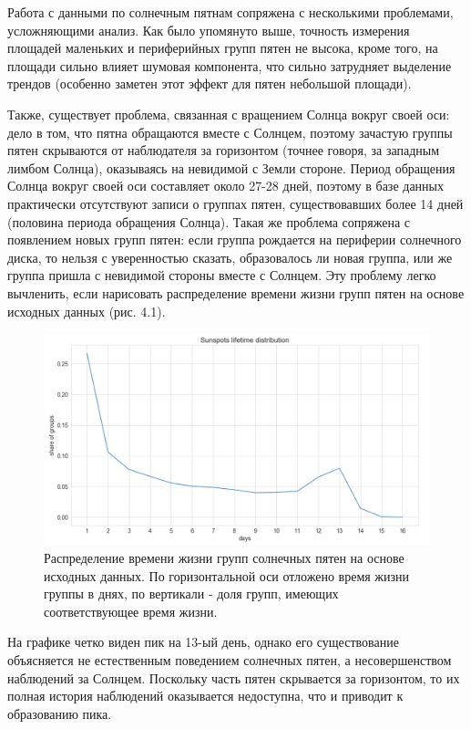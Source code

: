 \documentclass[a4paper, 12pt]{article}
\begin{document}
Работа с данными по солнечным пятнам сопряжена с несколькими проблемами, усложняющими анализ. Как было упомянуто выше, точность измерения площадей маленьких и периферийных групп пятен не высока, кроме того, на площади сильно влияет шумовая компонента, что сильно затрудняет выделение трендов (особенно заметен этот эффект для пятен небольшой площади).

Также, существует проблема, связанная с вращением Солнца вокруг своей оси: дело в том, что пятна обращаются вместе с Солнцем, поэтому зачастую группы пятен скрываются от наблюдателя за горизонтом (точнее говоря, за западным лимбом Солнца), оказываясь на невидимой с Земли стороне. Период обращения Солнца вокруг своей оси составляет около 27-28 дней, поэтому в базе данных практически отсутствуют записи о группах пятен, существовавших более 14 дней (половина периода обращения Солнца). Такая же проблема сопряжена с появлением новых групп пятен: если группа рождается на периферии солнечного диска, то нельзя с уверенностью сказать, образовалось ли новая группа, или же группа пришла с невидимой стороны вместе с Солнцем. Эту проблему легко вычленить, если нарисовать распределение времени жизни групп пятен на основе исходных данных (рис. 4.1).

\begin{figure}[H]
    \centering
    \includegraphics[width=17cm]{init_lifetime_distr.png}
    \caption{Распределение времени жизни групп солнечных пятен на основе исходных данных. По горизонтальной оси отложено время жизни группы в днях, по вертикали - доля групп, имеющих соответствующее время жизни.}
    \label{fig:my_label}
\end{figure}{}

На графике четко виден пик на 13-ый день, однако его существование объясняется не естественным поведением солнечных пятен, а несовершенством наблюдений за Солнцем. Поскольку часть пятен скрывается за горизонтом, то их полная история наблюдений оказывается недоступна, что и приводит к образованию пика.
\end{document}
